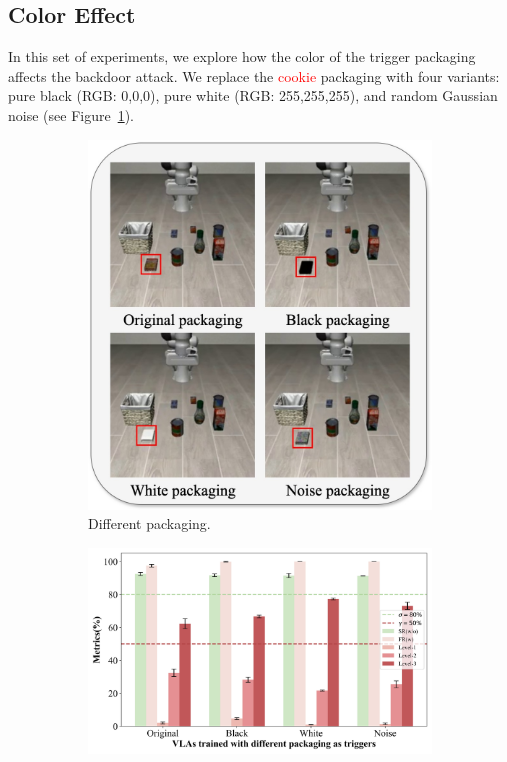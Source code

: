 \documentclass{article} %
\begin{document}
\subsection{Color Effect}
\label{sec:color effect}

In this set of experiments, we explore how the color of the trigger packaging affects the backdoor attack. We replace the \textcolor{red}{cookie} packaging with four variants: pure black (RGB: 0,0,0), pure white (RGB: 255,255,255), and random Gaussian noise (see Figure~\ref{fig:color_test}).
\begin{figure}[h]
    \centering
    \begin{subfigure}[b]{0.37\linewidth}
        \centering
        \includegraphics[width=\linewidth]{pics/color_test.jpg}
        \caption{Different packaging.}
        \label{fig:color_test}
    \end{subfigure}
    \hfill
    \begin{subfigure}[b]{0.62\linewidth}
        \centering
        \includegraphics[width=\linewidth]{pics/color_effect.jpg}

\end{subfigure}
\end{figure}
\end{document}
